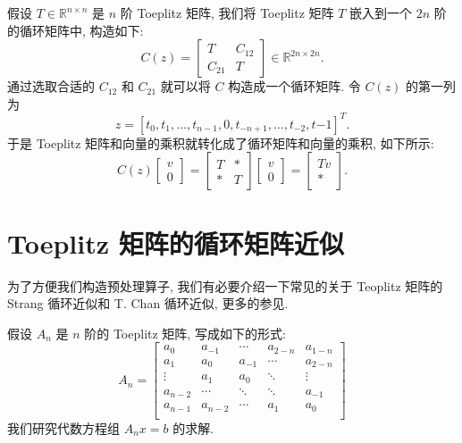 \documentclass{ecnumaster}
\begin{document}
假设 $T \in \mathbb{R}^{n \times n}$ 是 $n$ 阶 Toeplitz 矩阵,
我们将 Toeplitz 矩阵 $T$ 嵌入到一个 $2n$ 阶的循环矩阵中, 构造如下:
\begin{equation}\nonumber
  C(z) = \left[
  \begin{matrix}\nonumber
    T &C_{12}\\
    C_{21} &T
  \end{matrix}
  \right] \in \mathbb{R}^{2n \times 2n}.
\end{equation}
通过选取合适的 $C_{12}$ 和 $C_{21}$ 就可以将 $C$ 构造成一个循环矩阵.
令 $C(z)$ 的第一列为
\begin{equation}\nonumber
  z = [t_0, t_1, \dots, t_{n-1}, 0, t_{-n+1}, \dots, t_{-2}, t{-1}]^T.
\end{equation}
于是 Toeplitz 矩阵和向量的乘积就转化成了循环矩阵和向量的乘积, 如下所示:
$$
  C(z) \left[
  \begin{matrix}
    v\\
    0
  \end{matrix}
  \right] = \left[
  \begin{matrix}
    T &*\\
    * &T
  \end{matrix}
  \right] \left[
  \begin{matrix}
    v\\
    0
  \end{matrix}
  \right] = \left[
  \begin{matrix}
    Tv\\
    *
  \end{matrix}
  \right].
$$

\section{Toeplitz 矩阵的循环矩阵近似}
为了方便我们构造预处理算子,
我们有必要介绍一下常见的关于 Teoplitz 矩阵的 Strang 循环近似和 T. Chan 循环近似,
更多的参见\cite{CN96}.

假设 $A_n$ 是 $n$ 阶的 Toeplitz 矩阵, 写成如下的形式:
\begin{equation}\label{eq41}
  A_n =
  \left[
    \begin{matrix}
      a_0 & a_{-1} & \cdots & a_{2-n} & a_{1-n}\\
      a_1 & a_0 & a_{-1} & \cdots & a_{2-n}\\
      \vdots & a_1 & a_0 & \ddots & \vdots\\
      a_{n-2} & \cdots & \ddots & \ddots & a_{-1}\\
      a_{n-1} & a_{n-2} & \cdots & a_1 & a_0\\
    \end{matrix}
  \right]
\end{equation}
我们研究代数方程组 $A_n x = b$ 的求解.
\end{document}
